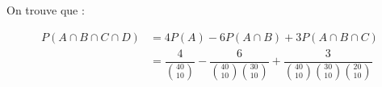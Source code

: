 \documentclass[8pt]{report}
\begin{document}
On trouve que :

\begin{align*}
P(A \cap B \cap C \cap D) &= 4P(A) - 6P(A \cap B) + 3P(A \cap B \cap C) \\
&= \dfrac{4}{{\binom{40}{10}}} - \dfrac{6}{{\binom{40}{10}\binom{30}{10}}} + \dfrac{3}{{\binom{40}{10}\binom{30}{10}\binom{20}{10}}}
\end{align*}

        





        



        

        
        




        
\end{document}
